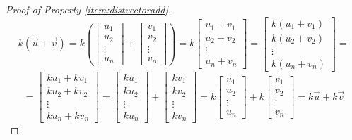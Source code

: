 \documentclass{ximera}
\begin{document}
\begin{proof}[Proof of Property \ref{item:distvectoradd}]
$$
k(\vec{u}+\vec{v})=k\left(\begin{bmatrix}
u_1\\
u_2\\
\vdots\\
u_n
\end{bmatrix}+\begin{bmatrix}
v_1\\
v_2\\
\vdots\\
v_n
\end{bmatrix}\right)=k\begin{bmatrix}
u_1+v_1\\
u_2+v_2\\
\vdots\\
u_n+v_n
\end{bmatrix}=\begin{bmatrix}
k(u_1+v_1)\\
k(u_2+v_2)\\
\vdots\\
k(u_n+v_n)
\end{bmatrix}=$$
$$=\begin{bmatrix}
ku_1+kv_1\\
ku_2+kv_2\\
\vdots\\
ku_n+kv_n
\end{bmatrix}=\begin{bmatrix}
ku_1\\
ku_2\\
\vdots\\
ku_n
\end{bmatrix}+\begin{bmatrix}
kv_1\\
kv_2\\
\vdots\\
kv_n
\end{bmatrix}=k\begin{bmatrix}
u_1\\
u_2\\
\vdots\\
u_n
\end{bmatrix}+k\begin{bmatrix}
v_1\\
v_2\\
\vdots\\
v_n
\end{bmatrix}
=k\vec{u}+k\vec{v}$$
\end{proof}
\end{document}
